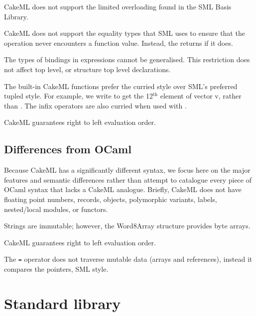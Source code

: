 \documentclass[12pt,a4paper]{book}
\begin{document}
CakeML does not support the limited overloading found in the SML Basis Library.

CakeML does not support the equality types that SML uses to ensure that the \smlinline{=} operation never encounters a function value. Instead, the \smlinline{=} returns  if it does.

The types of bindings in  expressions cannot be generalised. This restriction does not affect top level, or structure top level declarations.

The built-in CakeML functions prefer the curried style over SML's preferred tupled style. For example, we write  to get the 12$^\textrm{th}$ element of vector v, rather than . The infix operators are also curried when used with .

CakeML guarantees right to left evaluation order.

\section{Differences from OCaml}

Because CakeML has a significantly different syntax, we focus here on the major features and semantic differences rather than attempt to catalogue every piece of OCaml syntax that lacks a CakeML analogue. Briefly, CakeML does not have floating point numbers, records, objects, polymorphic variants, labels, nested/local modules, or functors.

Strings are immutable; however, the Word8Array structure provides byte arrays.

CakeML guarantees right to left evaluation order.

The \texttt{=} operator does not traverse mutable data (arrays and references), instead it compares the pointers, SML style.

\chapter{Standard library}
\label{ch:stdlib}

\end{document}
